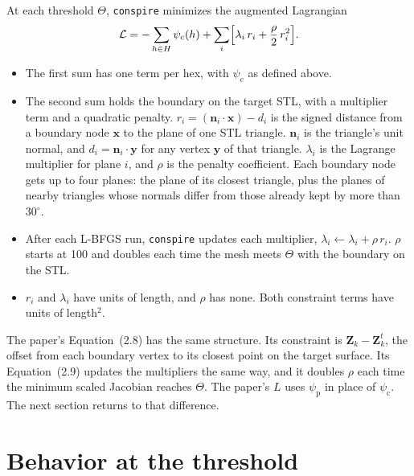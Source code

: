 \documentclass[11pt]{article}
\begin{document}
At each threshold $\Theta$, \texttt{conspire} minimizes the augmented Lagrangian
\begin{equation}
  \mathcal{L} = -\sum_{h \in H} \psi_{\mathrm{c}}(h) + \sum_{i} \Bigl[ \lambda_i \, r_i + \frac{\rho}{2} \, r_i^2 \Bigr]. \label{eq:L}
\end{equation}
\begin{itemize}[leftmargin=*]
  \item The first sum has one term per hex, with $\psi_{\mathrm{c}}$ as defined above.
  \item The second sum holds the boundary on the target STL, with a multiplier term and a quadratic penalty.
    $r_i = (\mathbf{n}_i \cdot \mathbf{x}) - d_i$ is the signed distance from a boundary node $\mathbf{x}$ to the plane of one STL triangle.
    $\mathbf{n}_i$ is the triangle's unit normal, and $d_i = \mathbf{n}_i \cdot \mathbf{y}$ for any vertex $\mathbf{y}$ of that triangle.
    $\lambda_i$ is the Lagrange multiplier for plane $i$, and $\rho$ is the penalty coefficient.
    Each boundary node gets up to four planes: the plane of its closest triangle, plus the planes of nearby triangles whose normals differ from those already kept by more than $30^\circ$.
  \item After each L-BFGS run, \texttt{conspire} updates each multiplier, $\lambda_i \leftarrow \lambda_i + \rho \, r_i$.
    $\rho$ starts at 100 and doubles each time the mesh meets $\Theta$ with the boundary on the STL.
  \item $r_i$ and $\lambda_i$ have units of length, and $\rho$ has none.
    Both constraint terms have units of length$^2$.
\end{itemize}
The paper's Equation~(2.8) has the same structure.
Its constraint is $\mathbf{Z}_k - \mathbf{Z}^t_k$, the offset from each boundary vertex to its closest point on the target surface.
Its Equation~(2.9) updates the multipliers the same way, and it doubles $\rho$ each time the minimum scaled Jacobian reaches $\Theta$.
The paper's $L$ uses $\psi_{\mathrm{p}}$ in place of $\psi_{\mathrm{c}}$. The next section returns to that difference.

\section*{Behavior at the threshold}
\end{document}
